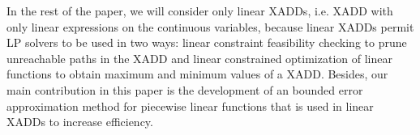 In the rest of the paper, we will consider only linear XADDs, i.e. XADD with only linear expressions on the continuous variables, because linear XADDs permit LP solvers to be used in two ways: linear constraint feasibility checking to prune unreachable paths in the XADD and linear constrained optimization of linear functions to obtain maximum and minimum values of a XADD. Besides, our main contribution in this paper is the development of an bounded error approximation method for piecewise linear functions that is used in linear XADDs to increase efficiency.

